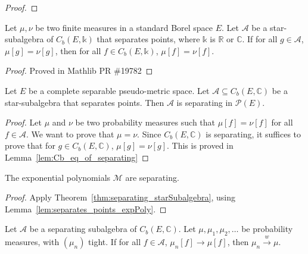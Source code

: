 \begin{proof}\leanok
{}
\end{proof}


\begin{lemma}\label{lem:Cb_eq_of_separating}
Let $\mu, \nu$ be two finite measures in a standard Borel space $E$. Let $\mathcal{A}$ be a star-subalgebra of $C_b(E, \mathbb{k})$ that separates points, where $\mathbb{k}$ is $\mathbb{R}$ or $\mathbb{C}$.
If for all $g \in \mathcal A$, $\mu[g] = \nu[g]$, then for all $f \in C_b(E, \mathbb{k})$, $\mu[f] = \nu[f]$.
\end{lemma}

\begin{proof}
Proved in Mathlib PR \#19782
\end{proof}


\begin{theorem}\label{thm:separating_starSubalgebra}
Let $E$ be a complete separable pseudo-metric space. Let $\mathcal A \subseteq C_b(E, \mathbb{C})$ be a star-subalgebra that separates points. Then $\mathcal A$ is separating in $\mathcal P(E)$.
\end{theorem}

\begin{proof}
Let $\mu$ and $\nu$ be two probability measures such that $\mu[f] = \nu[f]$ for all $f \in \mathcal A$. We want to prove that $\mu = \nu$. Since $C_b(E, \mathbb{C})$ is separating, it suffices to prove that for $g \in C_b(E, \mathbb{C})$, $\mu[g] = \nu[g]$. This is proved in Lemma~\ref{lem:Cb_eq_of_separating}
\end{proof}


\begin{lemma}\label{lem:separating_expPoly}
The exponential polynomials $\mathcal M$ are separating.
\end{lemma}

\begin{proof}
Apply Theorem~\ref{thm:separating_starSubalgebra}, using Lemma~\ref{lem:separates_points_expPoly}.
\end{proof}


\begin{lemma}\label{lem:cvg_of_separating}
Let $\mathcal A$ be a separating subalgebra of $C_b(E, \mathbb{C})$. Let $\mu, \mu_1, \mu_2, \ldots$ be probability measures, with $(\mu_n)$ tight. If for all $f \in \mathcal A$, $\mu_n[f] \to \mu[f]$, then $\mu_n \xrightarrow{w} \mu$.
\end{lemma}

